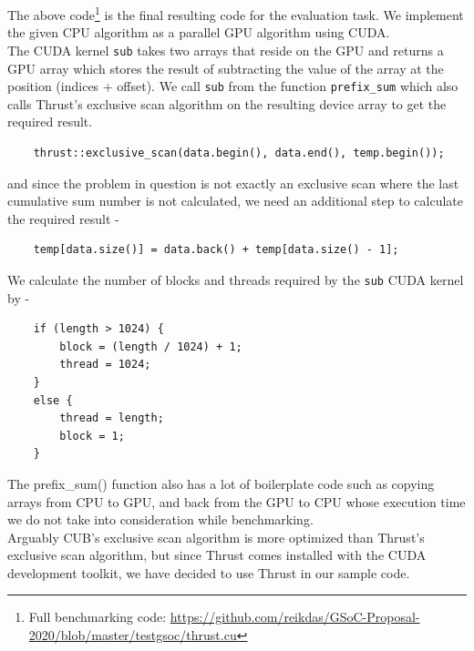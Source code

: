 \documentclass{article}
\begin{document}
The above code\footnote{Full benchmarking code: \url{https://github.com/reikdas/GSoC-Proposal-2020/blob/master/testgsoc/thrust.cu}} is the final resulting code for the evaluation task. We implement the given CPU algorithm as a parallel GPU algorithm using CUDA.\\
\noindent The CUDA kernel \texttt{sub} takes two arrays that reside on the GPU and returns a GPU array which stores the result of subtracting the value of the array at the position (indices + offset). We call \texttt{sub} from the function \texttt{prefix_sum} which also calls Thrust's exclusive scan \cite{scan} algorithm on the resulting device array to get the required result.
\begin{mdframed}[backgroundcolor=light-gray, roundcorner=10pt,leftmargin=0.5, rightmargin=0.5, innertopmargin=5,innerbottommargin=5, outerlinewidth=1, linecolor=light-gray]
\begin{verbatim}
    thrust::exclusive_scan(data.begin(), data.end(), temp.begin());
\end{verbatim}
\end{mdframed}
and since the problem in question is not exactly an exclusive scan where the last cumulative sum number is not calculated, we need an additional step to calculate the required result -
\begin{mdframed}[backgroundcolor=light-gray, roundcorner=10pt,leftmargin=0.5, rightmargin=0.5, innertopmargin=5,innerbottommargin=5, outerlinewidth=1, linecolor=light-gray]
\begin{verbatim}
    temp[data.size()] = data.back() + temp[data.size() - 1];
\end{verbatim}
\end{mdframed}
\noindent We calculate the number of blocks and threads required by the \texttt{sub} CUDA kernel by - 
\begin{mdframed}[backgroundcolor=light-gray, roundcorner=10pt,leftmargin=0.5, rightmargin=0.5, innertopmargin=5,innerbottommargin=5, outerlinewidth=1, linecolor=light-gray]
\begin{verbatim}
    if (length > 1024) {
        block = (length / 1024) + 1;
        thread = 1024;
    }
    else {
        thread = length;
        block = 1;
    }
\end{verbatim}
\end{mdframed}
The prefix\_sum() function also has a lot of boilerplate code such as copying arrays from CPU to GPU, and back from the GPU to CPU whose execution time we do not take into consideration while benchmarking.\\
\smallbreak
\noindent Arguably CUB's \cite{cub} exclusive scan algorithm is more optimized than Thrust's exclusive scan algorithm, but since Thrust comes installed with the CUDA development toolkit, we have decided to use Thrust in our sample code.
\end{document}
